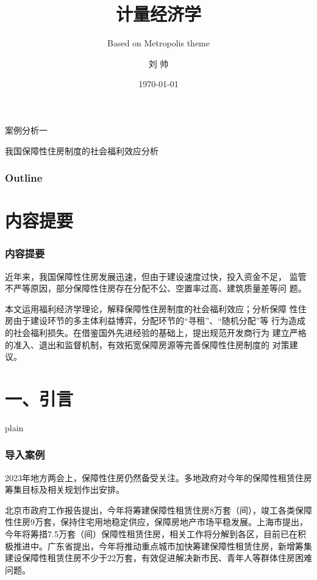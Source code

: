 \documentclass[aspectratio=169, 12pt]{beamer}
\title{计量经济学}
\subtitle{Based on Metropolis theme}
\author[LIU ShHUAI]{刘 {  } 帅}
\institute{山西师范大学 {  } 经济与管理学院}
\date{\today}
\begin{document}
\maketitle

\begin{frame}[standout]
    案例分析一\par
    \addtolength{\parskip}{.4em}
    我国保障性住房制度的社会福利效应分析
\end{frame}

\begin{frame}[plain]
    \frametitle{Outline}
    \tableofcontents[hideallsubsections]
  \end{frame}

\section{内容提要}

\begin{frame}[plain]
    \frametitle{内容提要}
    近年来，我国保障性住房发展迅速，但由于建设速度过快，投入资金不足，
监管不严等原因，部分保障性住房存在分配不公、空置率过高、建筑质量差等问
题。\par
本文运用福利经济学理论，解释保障性住房制度的社会福利效应；分析保障
性住房由于建设环节的多主体利益博弈，分配环节的“寻租”、“随机分配”等
行为造成的社会福利损失。在借鉴国外先进经验的基础上，提出规范开发商行为
建立严格的准入、退出和监督机制，有效拓宽保障房源等完善保障性住房制度的
对策建议。
\end{frame}

\section{一、引言}

\begin{frame}{plain}
    \frametitle{导入案例}
    2023年地方两会上，保障性住房仍然备受关注。多地政府对今年的保障性租赁住房筹集目标及相关规划作出安排。
    \par
    北京市政府工作报告提出，今年将筹建保障性租赁住房8万套（间），竣工各类保障性住房9万套，保持住宅用地稳定供应，保障房地产市场平稳发展。上海市提出，今年将筹措7.5万套（间）保障性租赁住房，相关工作将分解到各区，目前已在积极推进中。广东省提出，今年将推动重点城市加快筹建保障性租赁住房，新增筹集建设保障性租赁住房不少于22万套，有效促进解决新市民、青年人等群体住房困难问题。
\end{frame}
\end{document}
